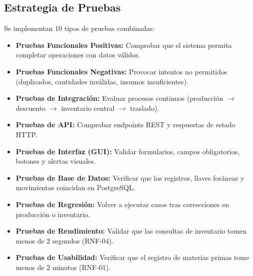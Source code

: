 \documentclass[11pt,a4paper]{article}
\begin{document}
\subsection{Estrategia de Pruebas}
Se implementan 10 tipos de pruebas combinadas:
\begin{itemize}
    \item \textbf{Pruebas Funcionales Positivas:} Comprobar que el sistema permita completar operaciones con datos válidos.
    \item \textbf{Pruebas Funcionales Negativas:} Provocar intentos no permitidos (duplicados, cantidades inválidas, insumos insuficientes).
    \item \textbf{Pruebas de Integración:} Evaluar procesos continuos (producción $\rightarrow$ descuento $\rightarrow$ inventario central $\rightarrow$ traslado).
    \item \textbf{Pruebas de API:} Comprobar endpoints REST y respuestas de estado HTTP.
    \item \textbf{Pruebas de Interfaz (GUI):} Validar formularios, campos obligatorios, botones y alertas visuales.
    \item \textbf{Pruebas de Base de Datos:} Verificar que los registros, llaves foráneas y movimientos coincidan en PostgreSQL.
    \item \textbf{Pruebas de Regresión:} Volver a ejecutar casos tras correcciones en producción o inventario.
    \item \textbf{Pruebas de Rendimiento:} Validar que las consultas de inventario tomen menos de 2 segundos (RNF-04).
    \item \textbf{Pruebas de Usabilidad:} Verificar que el registro de materias primas tome menos de 2 minutos (RNF-01).
\end{itemize}
\end{document}
